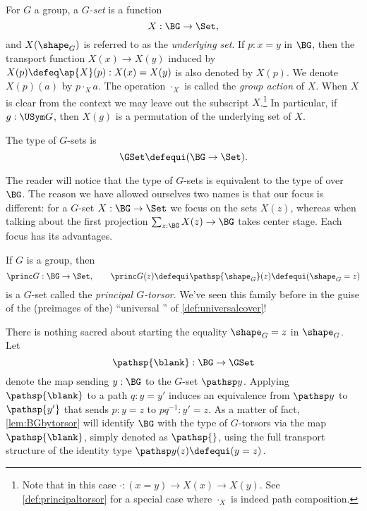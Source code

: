 \begin{definition}
  For $G$ a group, a \emph{$G$-set} is a function
  $$X : \BG\to\Set,$$
and $X(\shape_G)$ is referred to as the \emph{underlying set}.
If $p:x=y$ in $\BG$, then the transport function $X(x)\to X(y)$ induced
by $X(p)\defeq\ap{X}(p) : X(x)=X(y)$ is also denoted by $X(p)$.
We denote $X(p)(a)$ by $p\cdot_X a$.
The operation $\cdot_X$ is called the \emph{group action} of $X$.
When $X$ is clear from the context we may leave out the
subscript $X$.\footnote{%
Note that in this case $\cdot: (x=y)\to X(x) \to X(y)$.
See \cref{def:principaltorsor} for a special case
where $\cdot_X$ is indeed path composition.}
In particular, if $g:\USym G$,
then $X(g)$ is a permutation of the underlying set of $X$.

The type of $G$-sets is $$\GSet\defequi(\BG\to\Set).$$
\end{definition}
\begin{remark}
  The reader will notice that the type of $G$-sets is equivalent to the
type of \coverings over $\BG$.
The reason we have allowed ourselves two names is that our focus is different: for a $G$-set $X:\BG\to\Set$ we focus on the sets $X(z)$, whereas when talking about \coverings the first projection $\sum_{z:\BG}X(z)\to \BG$ takes center stage.  Each focus has its advantages.
\end{remark}

\begin{example}\label{def:principaltorsor}
  If $G$ is a group, then
$$\princ G:\BG\to\Set,\qquad\princ G(z)\defequi\pathsp{\shape_G}(z)\defequi(\shape_G=z)$$ is a $G$-set called the \emph{principal $G$-torsor}.
We've seen this family before in the guise of the (preimages of the) ``universal \covering'' of \cref{def:universalcover}!

There is nothing sacred about starting the equality $\shape_G = z$ in $\shape_G$.
Let
$$\pathsp{\blank}:\BG\to\GSet$$ denote the map sending $y:\BG$ to the $G$-set $\pathsp y$.
Applying $\pathsp{\blank}$ to a path $q:y=y'$
induces an equivalence from $\pathsp y$ to $\pathsp {y'}$ that sends $p:y=z$ to $pq^{-1}:y'=z$. As a matter of fact, \cref{lem:BGbytorsor} will identify $\BG$ with the type of $G$-torsors via the map $\pathsp{\blank}$, simply denoted as $\pathsp{}$,
using the full transport structure of the identity type $\pathsp y(z)\defequi(y=z)$.
\end{example}

